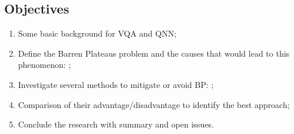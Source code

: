 \subsection{Objectives}

\begin{enumerate}
    \item Some basic background for VQA and QNN;
    \item Define the Barren Plateaus problem and the causes that would lead to this phenomenon: \cite{wangNoiseinducedBarrenPlateaus2021,zhaoAnalyzingBarrenPlateau2021};
    \item Investigate several methods to mitigate or avoid BP: \cite{pesahAbsenceBarrenPlateaus2021, pattiEntanglementDevisedBarren2021,liuParameterInitializationMethod2021};
    \item Comparison of their advantage/disadvantage to identify the best approach;
    \item Conclude the research with summary and open issues.
\end{enumerate}